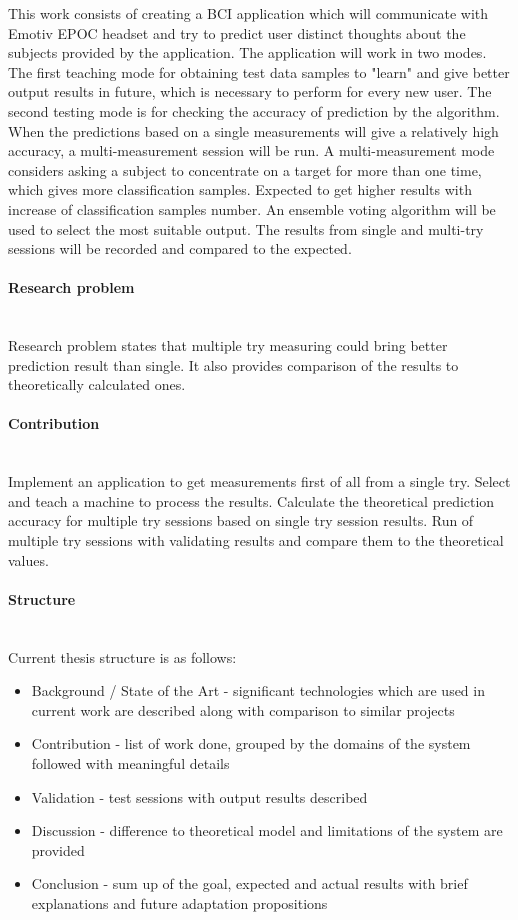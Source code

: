 \documentclass[12pt]{article}
\begin{document}
This work consists of creating a BCI application which will communicate with Emotiv EPOC headset and try to predict user distinct thoughts about the subjects provided by the application. The application will work in two modes. The first teaching mode for obtaining test data samples to "learn" and give better output results in future, which is necessary to perform for every new user. The second testing mode is for checking the accuracy of prediction by the algorithm. When the predictions based on a single measurements will give a relatively high accuracy, a multi-measurement session will be run. A multi-measurement mode considers asking a subject to concentrate on a target for more than one time, which gives more classification samples. Expected to get higher results with increase of classification samples number. An ensemble voting algorithm will be used to select the most suitable output. The results from single and multi-try sessions will be recorded and compared to the expected.
\paragraph{Research problem}~\\

Research problem states that multiple try measuring could bring better prediction result than single. It also provides comparison of the results to theoretically calculated ones.
\paragraph{Contribution}~\\

Implement an application to get measurements first of all from a single try. Select and teach a machine to process the results. Calculate the theoretical prediction accuracy for multiple try sessions based on single try session results. Run of multiple try sessions with validating results and compare them to the theoretical values.
\paragraph{Structure}~\\
Current thesis structure is as follows:

\begin{itemize}
\item Background / State of the Art - significant technologies which are used in current work are described along with comparison to similar projects
\item Contribution - list of work done, grouped by the domains of the system followed with meaningful details
\item Validation - test sessions with output results described
\item Discussion - difference to theoretical model and limitations of the system are provided
\item Conclusion - sum up of the goal, expected and actual results with brief explanations and future adaptation propositions
\end{itemize}
\end{document}
